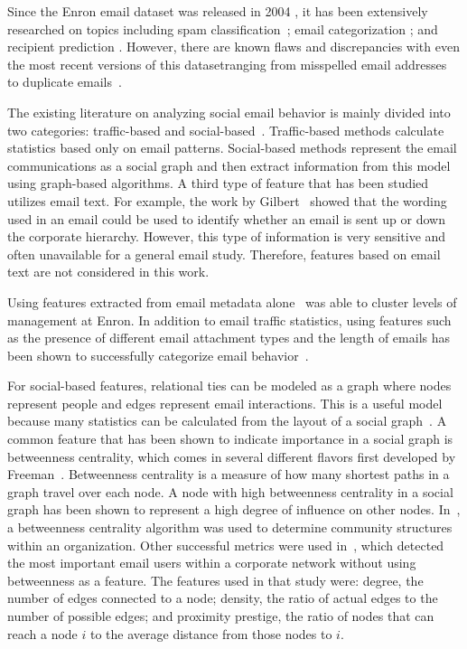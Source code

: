 \documentclass[10pt,twocolumn,conference]{IEEEtran}
\begin{document}
Since the Enron email dataset was released in 2004 \cite{klimt_introducing_2004}, it has been extensively researched on topics including spam classification~\cite{martin_analyzing_2005}; email categorization \cite{he_novel_2014}; and recipient prediction \cite{sofershtein_predicting_2015}.
However, there are known flaws and discrepancies with even the most recent versions of this dataset\textemdash{}ranging from misspelled email addresses~\cite{nordbo_data_2014} to duplicate emails~\cite{waterman_big_2014}.

The existing literature on analyzing social email behavior is mainly divided into two categories: traffic-based and social-based~\cite{tang_email_2013}.
Traffic-based methods calculate statistics based only on email patterns.
Social-based methods represent the email communications as a social graph and then extract information from this model using graph-based algorithms.
A third type of feature that has been studied utilizes email text.
For example, the work by Gilbert~\cite{gilbert2012phrases} showed that the wording used in an email could be used to identify whether an email is sent up or down the corporate hierarchy.
However, this type of information is very sensitive and often unavailable for a general email study.
Therefore, features based on email text are not considered in this work.

Using features extracted from email metadata alone~\cite{yelupula_social_2008} was able to cluster levels of management at Enron.
In addition to email traffic statistics, using features such as the presence of different email attachment types and the length of emails has been shown to successfully categorize email behavior~\cite{martin_analyzing_2005}.

For social-based features, relational ties can be modeled as a graph where nodes represent people and edges represent email interactions.
This is a useful model because many statistics can be calculated from the layout of a social graph~\cite{wasserman_social_1994}.
A common feature that has been shown to indicate importance in a social graph is betweenness centrality, which comes in several different flavors first developed by Freeman~\cite{freeman_set_1977}.
Betweenness centrality is a measure of how many shortest paths in a graph travel over each node.
A node with high betweenness centrality in a social graph has been shown to represent a high degree of influence on other nodes.
In~\cite{tyler_email_2003}, a betweenness centrality algorithm was used to determine community structures within an organization.
Other successful metrics were used in~\cite{wilson_discovery_2009}, which detected the most important email users within a corporate network without using betweenness as a feature.
The features used in that study were: degree, the number of edges connected to a node; density, the ratio of actual edges to the number of possible edges; and proximity prestige, the ratio of nodes that can reach a node $i$ to the average distance from those nodes to $i$.
\end{document}
